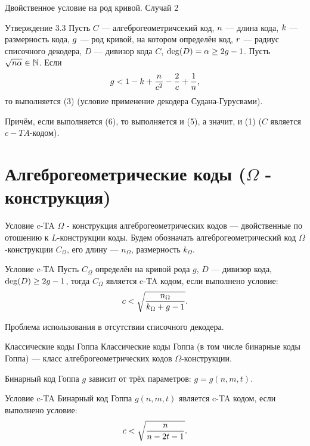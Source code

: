 \documentclass{beamer}
\begin{document}
\begin {frame} {Двойственное условие на род кривой. Случай 2}
\begin {block} {Утверждение 3.3}
Пусть  $C$ --- алгеброгеометричсекий код, ${\sl n}$  --- длина кода,  ${\sl k}$  --- размерность кода, ${\sl g}$ --- род кривой, на котором определён код, ${\sl r}$ --- радиус списочного декодера,  $D$ --- дивизор кода $C$, ${\rm deg}(D) = \alpha \ge 2g-1$. Пусть $\sqrt { {\sl n}\alpha } \in {\mathbb N}$.
Если
\begin {equation}
 {\sl g} < 1 - k + \frac {\sl n}{\sl c^2} - \frac {2}{\sl c} + \frac {1}{\sl n},
\end {equation}
то выполняется (3) (условие применение декодера Судана-Гурусвами).

Причём, если выполняется (6), то выполняется и (5),
а значит, и (1)  ($C$ является $c-TA$-кодом).

\end {block}
\end {frame}

\section {Алгеброгеометрические коды ($\Omega$ - конструкция)}

\begin {frame}
\tableofcontents[currentsection]
\end {frame}

\begin {frame} {Условие c-TA}
 $\Omega$ - конструкция алгеброгеометрических кодов --- двойственные по отошению к $L$-конструкции коды. Будем обозначать алгеброгеометрический код ${\Omega}$-конструкции $C_{\Omega}$, его длину --- $n_{\Omega}$, размерность  $k_{\Omega}$.

\begin {block} {Условие c-TA}
Пусть $C_{\Omega}$ определён на кривой рода $g$, $D$ --- дивизор кода, ${\rm deg}(D) \ge 2g - 1$, тогда $C_{\Omega}$  является c-TA кодом, если выполнено условие:
$$ {\sl c} < \sqrt {\frac {\sl n_{\Omega}}{k_{\Omega}+g-1}} .$$
\end {block}

Проблема использования в отсутствии списочного декодера.
\end {frame}

\begin {frame} {Классические коды Гоппа}
Классические коды Гоппа (в том числе бинарные коды Гоппа) --- класс алгеброгеометрических кодов ${\Omega}$-конструкции.

Бинарный код Гоппа $g$ зависит от трёх параметров: $g = g(n, m, t)$.

\begin {block} {Условие c-TA}
Бинарный код Гоппа $g(n,m,t)$ является c-TA кодом, если выполнено условие:
$$ {\sl c} < \sqrt {\frac {\sl n}{n - 2t - 1}}.$$
\end {block}
\end {frame}
\end{document}
